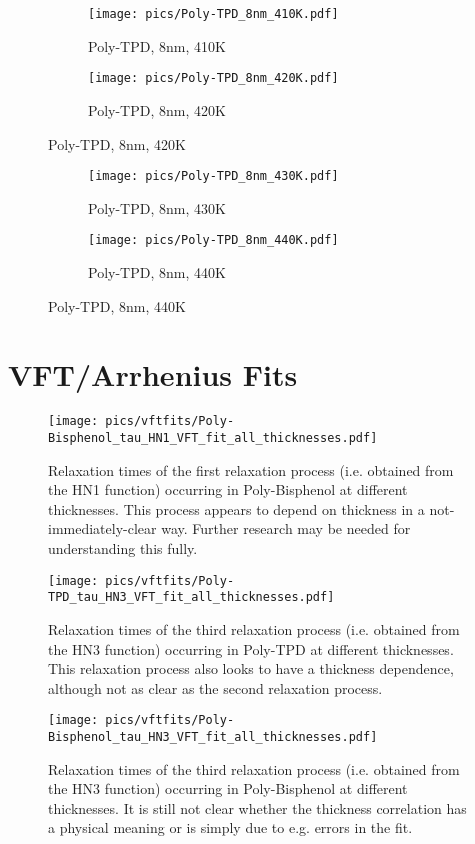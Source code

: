 \begin{figure}[!htb]
\centering
\begin{subfigure}[t]{.5\textwidth}
  \centering
  \texttt{[image: pics/Poly-TPD\_8nm\_410K.pdf]}
  \caption{Poly-TPD, 8nm, 410K}
  \label{fig:sub97}
\end{subfigure}%
\begin{subfigure}[t]{.5\textwidth}
  \centering
  \texttt{[image: pics/Poly-TPD\_8nm\_420K.pdf]}
  \caption{Poly-TPD, 8nm, 420K}
  \label{fig:sub98}
\end{subfigure}%
\end{figure}

\begin{figure}[!htb]
\centering
\begin{subfigure}[t]{.5\textwidth}
  \centering
  \texttt{[image: pics/Poly-TPD\_8nm\_430K.pdf]}
  \caption{Poly-TPD, 8nm, 430K}
  \label{fig:sub99}
\end{subfigure}%
\begin{subfigure}[t]{.5\textwidth}
  \centering
  \texttt{[image: pics/Poly-TPD\_8nm\_440K.pdf]}
  \caption{Poly-TPD, 8nm, 440K}
  \label{fig:sub100}
\end{subfigure}%
\end{figure}



\chapter{VFT/Arrhenius Fits}


\begin{figure}[t]%
  \centering
  \texttt{[image: pics/vftfits/Poly-Bisphenol\_tau\_HN1\_VFT\_fit\_all\_thicknesses.pdf]}
  \caption{Relaxation times of the first relaxation process (i.e. obtained from the HN1 function) occurring in Poly-Bisphenol at different thicknesses. This process appears to depend on thickness in a not-immediately-clear way. Further research may be needed for understanding this fully.}
  \label{bishn1}
\end{figure}%

\begin{figure}[t]%
  \centering
  \texttt{[image: pics/vftfits/Poly-TPD\_tau\_HN3\_VFT\_fit\_all\_thicknesses.pdf]}
  \caption{Relaxation times of the third relaxation process (i.e. obtained from the HN3 function) occurring in Poly-TPD at different thicknesses. This relaxation process also looks to have a thickness dependence, although not as clear as the second relaxation process. }
  \label{tpdhn3}
\end{figure}%


\begin{figure}[t]%
  \centering
  \texttt{[image: pics/vftfits/Poly-Bisphenol\_tau\_HN3\_VFT\_fit\_all\_thicknesses.pdf]}
  \caption{Relaxation times of the third relaxation process (i.e. obtained from the HN3 function) occurring in Poly-Bisphenol at different thicknesses. It is still not clear whether the thickness correlation has a physical meaning or is simply due to e.g. errors in the fit.}
  \label{bishn3}
\end{figure}%
